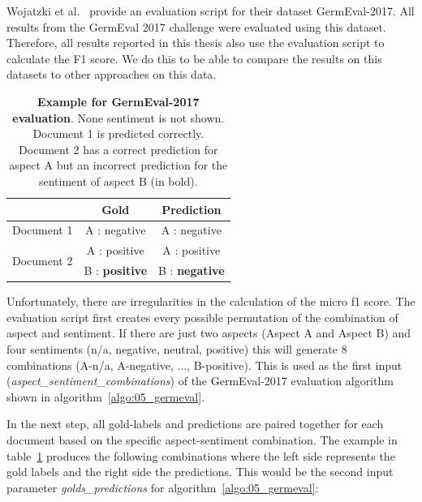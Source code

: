 Wojatzki et al.~\cite{Wojatzki} provide an evaluation script for their dataset GermEval-2017. All results from the GermEval 2017 challenge were evaluated using this dataset. Therefore, all results reported in this thesis also use the evaluation script to calculate the F1 score. We do this to be able to compare the results on this datasets to other approaches on this data.
\medskip

\begin{table}[ht]
    \centering
    \begin{tabular}{@{}lcc}
        \toprule 
        & \textbf{Gold} & \textbf{Prediction} \\ 
        \midrule 
        Document 1 & A : negative & A : negative \\
        \midrule 
        \multirow{2}{*}{Document 2} & A : positive & A : positive \\
        & B : \textbf{positive} & B : \textbf{negative} \\ 
        \bottomrule 
	\end{tabular}
	\caption{\textbf{Example for GermEval-2017 evaluation}. None sentiment is not shown. Document 1 is predicted correctly. Document 2 has a correct prediction for aspect A but an incorrect prediction for the sentiment of aspect B {(in bold)}.}

    \label{tab:05_germevalEvaluationExample}

\end{table}

Unfortunately, there are irregularities in the calculation of the micro f1 score. The evaluation script first creates every possible permutation of the combination of aspect and sentiment. If there are just two aspects {(Aspect A and Aspect B)} and four sentiments {(n/a, negative, neutral, positive)} this will generate 8 combinations {(A-n/a, A-negative, ..., B-positive)}. This is used as the first input {(\textit{aspect\_sentiment\_combinations})} of the GermEval-2017 evaluation algorithm shown in algorithm~\ref{algo:05_germeval}.
\medskip

In the next step, all gold-labels and predictions are paired together for each document based on the specific aspect-sentiment combination. The example in table~\ref{tab:05_germevalEvaluationExample} produces the following combinations where the left side represents the gold labels and the right side the predictions. This would be the second input parameter \textit{golds\_predictions} for algorithm~\ref{algo:05_germeval}: 


